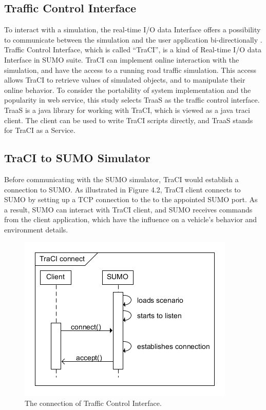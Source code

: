 \documentclass[12pt]{ksthesis}
\begin{document}
\begin{thesis}
{\section{Traffic Control Interface}
To interact with a simulation, the real-time I/O data Interface offers a possibility to communicate between the simulation and the user application bi-directionally \cite{Fischer}. Traffic Control Interface, which is called “TraCI”, is a kind of Real-time I/O data Interface in SUMO suite.
TraCI can implement online interaction with the simulation, and have the access to a running road traffic simulation. This access allows TraCI to retrieve values of simulated objects, and to manipulate their online behavior.
To consider the portability of system implementation and the popularity in web service, this study selects TraaS as the traffic control interface. TraaS is a java library for working with TraCI, which is viewed as a java traci client. The client can be used to write TraCI scripts directly, and TraaS stands for TraCI as a Service.

\subsection{TraCI to SUMO Simulator}
Before communicating with the SUMO simulator, TraCI would establish a connection to SUMO. As illustrated in Figure 4.2, TraCI client connects to SUMO by setting up a TCP connection to the to the appointed SUMO port. As a result, SUMO can interact with TraCI client, and SUMO receives commands from the client application, which have the influence on a vehicle’s behavior and environment details.

\begin{figure}[t!]
\centering
\includegraphics[scale=1]{./Thesis_figures/F4-2_TraCI_connection.PNG}
\caption{\large The connection of Traffic Control Interface.}
\vspace{0.5cm}
\label{Fig:TraCI_connection}
\end{figure}


}
\end{thesis}
\end{document}
